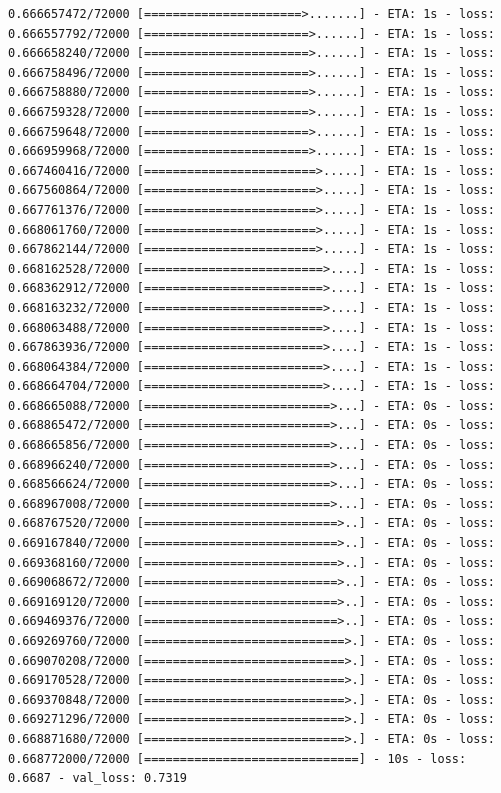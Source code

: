 \documentclass[12pt,fleqn]{article}\usepackage{../../common}
\begin{document}
\begin{verbatim}
0.666657472/72000 [======================>.......] - ETA: 1s - loss: 0.666557792/72000 [=======================>......] - ETA: 1s - loss: 0.666658240/72000 [=======================>......] - ETA: 1s - loss: 0.666758496/72000 [=======================>......] - ETA: 1s - loss: 0.666758880/72000 [=======================>......] - ETA: 1s - loss: 0.666759328/72000 [=======================>......] - ETA: 1s - loss: 0.666759648/72000 [=======================>......] - ETA: 1s - loss: 0.666959968/72000 [=======================>......] - ETA: 1s - loss: 0.667460416/72000 [========================>.....] - ETA: 1s - loss: 0.667560864/72000 [========================>.....] - ETA: 1s - loss: 0.667761376/72000 [========================>.....] - ETA: 1s - loss: 0.668061760/72000 [========================>.....] - ETA: 1s - loss: 0.667862144/72000 [========================>.....] - ETA: 1s - loss: 0.668162528/72000 [=========================>....] - ETA: 1s - loss: 0.668362912/72000 [=========================>....] - ETA: 1s - loss: 0.668163232/72000 [=========================>....] - ETA: 1s - loss: 0.668063488/72000 [=========================>....] - ETA: 1s - loss: 0.667863936/72000 [=========================>....] - ETA: 1s - loss: 0.668064384/72000 [=========================>....] - ETA: 1s - loss: 0.668664704/72000 [=========================>....] - ETA: 1s - loss: 0.668665088/72000 [==========================>...] - ETA: 0s - loss: 0.668865472/72000 [==========================>...] - ETA: 0s - loss: 0.668665856/72000 [==========================>...] - ETA: 0s - loss: 0.668966240/72000 [==========================>...] - ETA: 0s - loss: 0.668566624/72000 [==========================>...] - ETA: 0s - loss: 0.668967008/72000 [==========================>...] - ETA: 0s - loss: 0.668767520/72000 [===========================>..] - ETA: 0s - loss: 0.669167840/72000 [===========================>..] - ETA: 0s - loss: 0.669368160/72000 [===========================>..] - ETA: 0s - loss: 0.669068672/72000 [===========================>..] - ETA: 0s - loss: 0.669169120/72000 [===========================>..] - ETA: 0s - loss: 0.669469376/72000 [===========================>..] - ETA: 0s - loss: 0.669269760/72000 [============================>.] - ETA: 0s - loss: 0.669070208/72000 [============================>.] - ETA: 0s - loss: 0.669170528/72000 [============================>.] - ETA: 0s - loss: 0.669370848/72000 [============================>.] - ETA: 0s - loss: 0.669271296/72000 [============================>.] - ETA: 0s - loss: 0.668871680/72000 [============================>.] - ETA: 0s - loss: 0.668772000/72000 [==============================] - 10s - loss: 0.6687 - val_loss: 0.7319

\end{verbatim}
\end{document}
